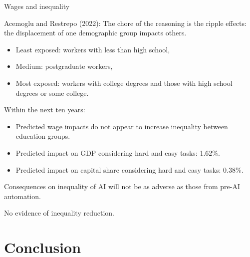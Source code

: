\documentclass{beamer}
\begin{document}
\begin{frame}{Wages and inequality}

Acemoglu and Restrepo (2022): The chore of the reasoning is the ripple effects: the displacement of one demographic group impacts others.

\begin{itemize}
    \item Least exposed: workers with less than high school,
    \item Medium: postgraduate workers,
    \item Most exposed: workers with college degrees and those with high school degrees or some college.
\end{itemize}

Within the next ten years:
\begin{itemize}
    \item Predicted wage impacts do not appear to increase inequality between education groups.
    \item Predicted impact on GDP considering hard and easy tasks: 1.62\%.
    \item Predicted impact on capital share considering hard and easy tasks: 0.38\%.
\end{itemize}

Consequences on inequality of AI will not be as adverse as those from pre-AI automation.

No evidence of inequality reduction.

\end{frame}       

\section{Conclusion}
\end{document}

